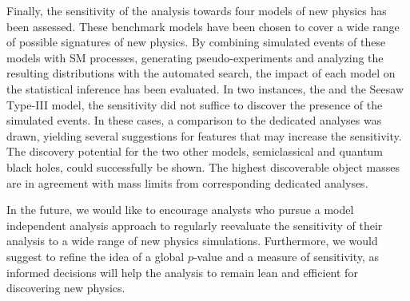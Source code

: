 Finally, the sensitivity of the analysis towards four models of new physics has been assessed. These benchmark models have been chosen to cover a wide range of possible signatures of new physics. By combining simulated events of these models with \acl{SM} processes, generating pseudo-experiments and analyzing the resulting distributions with the automated search, the impact of each model on the statistical inference has been evaluated. 
In two instances, the \PWprime and the Seesaw Type-III model, the sensitivity did not suffice to discover the presence of the simulated events. In these cases, a comparison to the dedicated analyses was drawn, yielding several suggestions for features that may increase the sensitivity.
The discovery potential for the two other models, semiclassical and quantum black holes, could successfully be shown. The highest discoverable object masses are in agreement with mass limits from corresponding dedicated analyses.

In the future, we would like to encourage analysts who pursue a model independent analysis approach to regularly reevaluate the sensitivity of their analysis to a wide range of new physics simulations. Furthermore, we would suggest to refine the idea of a global $p$-value and a measure of sensitivity, as informed decisions will help the analysis to remain lean and efficient for discovering new physics.

